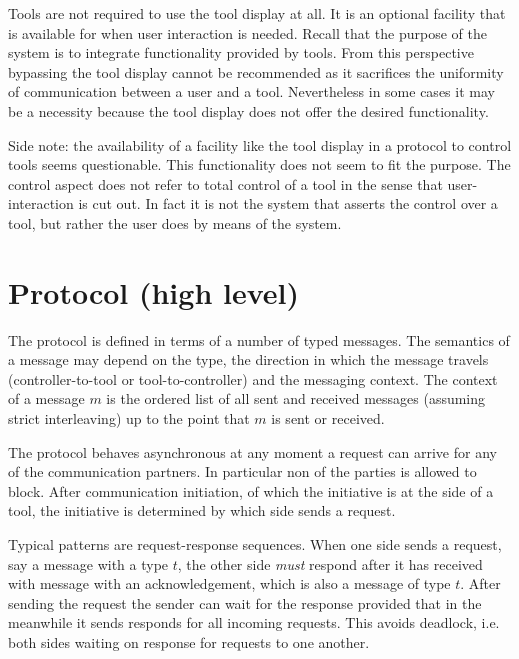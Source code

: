 \documentclass{article}
\begin{document}
   Tools are not required to use the tool display at all. It is an optional
   facility that is available for when user interaction is needed. Recall that
   the purpose of the system is to integrate functionality provided by tools.
   From this perspective bypassing the tool display cannot be recommended as it
   sacrifices the uniformity of communication between a user and a tool.
   Nevertheless in some cases it may be a necessity because the tool display
   does not offer the desired functionality.

   Side note: the availability of a facility like the tool display in a
   protocol to control tools seems questionable. This functionality does not
   seem to fit the purpose. The control aspect does not refer to total control
   of a tool in the sense that user-interaction is cut out. In fact it is not
   the system that asserts the control over a tool, but rather the user does by
   means of the system.


 \section{Protocol (high level)} \label{s:message_definitions}

  The protocol is defined in terms of a number of typed messages. The semantics
  of a message may depend on the type, the direction in which the message
  travels (controller-to-tool or tool-to-controller) and the messaging context.
  The context of a message $m$ is the ordered list of all sent and received
  messages (assuming strict interleaving) up to the point that $m$ is sent or
  received.

  The protocol behaves asynchronous at any moment a request can arrive for any
  of the communication partners. In particular non of the parties is allowed to
  block. After communication initiation, of which the initiative is at the side
  of a tool, the initiative is determined by which side sends a request.

  Typical patterns are request-response sequences. When one side sends a
  request, say a message with a type $t$, the other side \emph{must} respond
  after it has received with message with an acknowledgement, which is also a
  message of type $t$. After sending the request the sender can wait for the
  response provided that in the meanwhile it sends responds for all incoming
  requests. This avoids deadlock, i.e. both sides waiting on response for
  requests to one another.
\end{document}
